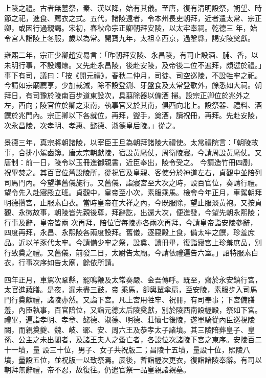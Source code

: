 \begin{pinyinscope}
 上陵之禮。古者無墓祭，秦、漢以降，始有其儀。至唐，復有清明設祭，朔望、時節之祀，進食、薦衣之式。五代，諸陵遠者，令本州長吏朝拜，近者遣太常、宗正卿，或因行過親謁。宋初，春秋命宗正卿朝拜安陵，以太牢奉祠。乾德三
 年，始令宮人詣陵上冬服，歲以為常。開寶九年，太祖幸西京，過鞏縣，謁安陵奠獻。



 雍熙二年，宗正少卿趙安易言：「昨朝拜安陵、永昌陵，有司止設酒、脯、香，以未明行事，不設燭燎。又先赴永昌陵，後赴安陵，及帝後二位不遍拜，頗愆於禮。」事下有司，議曰：「按《開元禮》，春秋二仲月，司徒、司空巡陵，不設牲牢之祀。今請如宗廟薦享，少加裁減，除不設登鉶、牙盤食及太常登歌外，餘悉如大祠。朝拜日，有司豫於陵南百步道東設次，具翦除器以備酒
 掃。設宗正卿位於兆外之左，西向；陵官位於卿之東南，執事官又於其南，俱西向北上。設祭器、禮料、酒饌於兆門內。宗正卿以下各就位，再拜，盥手，奠酒，讀祝冊，再拜。先赴安陵，次永昌陵，次孝明、孝惠、懿德、淑德皇后陵。」從之。



 景德三年，真宗將朝諸陵，以宰臣王旦為朝拜諸陵大禮使。太常禮院言：「朝陵故事，合排小駕鹵簿。唐太宗朝獻陵，宿設黃麾仗，周衛陵寢。今請周設黃麾仗。又唐制：前一日，陵令以玉冊進御親書，近臣奉出，陵令受之。
 今請造竹冊四副，祝畢焚之。其百官位舊設陵所，從祝官及皇親、客使分於神道左右，貞觀中並陪列司馬門內。今望準舊儀施行。又舊儀，詣寢宮至大次之時，設百官位，奏請行禮。望令先入赴寢殿立班。貞觀中，皇帝至小次，素服乘馬。檢會今年正月，車駕朝拜明德攢宮，止服素白衣。當時皇帝在大祥之內，今既服除，望止服淡黃袍。又按貞觀、永徽故事，朝陵皆先親後尊，拜辭訖，出還大次，便進發，今望先朝永熙陵；行事及辭，皇帝皆兩
 次再拜，陪位官每陵亦各兩次再拜，今請皇帝詣安陵參辭，四度再拜，永昌、永熙陵各兩度設拜。舊儀，逐寢殿上食，備太牢之饌，珍羞庶品。近以羊豕代太牢。今請備少牢之祭，設奠、讀冊畢，復詣寢宮上珍羞庶品，別行致奠之禮。又舊儀，前發二日，太尉告太廟。今請依禮遍告六室。」詔特服素白衣，行事次序如告太廟，餘依所請。



 四年正月，車駕次鞏縣，罷鳴鞭及太常奏嚴、金吾傳呼。既至，齋於永安鎮行宮，太官進蔬膳。是夜，漏未盡三鼓，帝
 乘馬，卻輿輦傘扇，至安陵，素服步入司馬門行奠獻禮，諸陵亦然。又詣下宮。凡上宮用牲牢、祝冊，有司奉事；下宮備膳羞，內臣執事，百官陪位，又詣元德太后陵奠獻，別於陵西南設幄殿，祭如下宮。禮畢，遍詣孝明、孝章、懿德、淑德、明德、莊懷七後陵，遂單騎從內臣巡視陵闕，而親奠夔、魏、岐、鄆、安、周六王及恭孝太子諸墳。其三陵陪葬皇子、皇孫、公主之未出閣者，及諸王夫人之蚤亡者，各設位次諸陵下宮之東序。安陵百二十一墳，量
 設三十位，男子、女子共祝版二；昌陵十五墳，量設十位，熙陵八墳，量設五位，並祝版一以致祭焉。辰後，暫詣幄次更衣，復詣諸陵奉辭。有司以朝拜無辭禮，帝不忍，故復往。仍遣官祭一品皇親諸親墓。




\end{pinyinscope}
